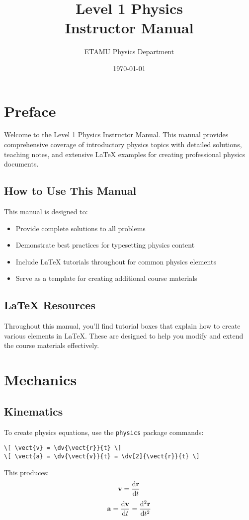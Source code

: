 \documentclass[11pt]{book}
\title{Level 1 Physics\\Instructor Manual}
\author{ETAMU Physics Department}
\date{\today}
\begin{document}
\frontmatter
\maketitle

\tableofcontents
\listoffigures

\chapter{Preface}

Welcome to the Level 1 Physics Instructor Manual. This manual provides comprehensive coverage of introductory physics topics with detailed solutions, teaching notes, and extensive LaTeX examples for creating professional physics documents.

\section{How to Use This Manual}

This manual is designed to:
\begin{itemize}
    \item Provide complete solutions to all problems
    \item Demonstrate best practices for typesetting physics content
    \item Include LaTeX tutorials throughout for common physics elements
    \item Serve as a template for creating additional course materials
\end{itemize}

\section{LaTeX Resources}

Throughout this manual, you'll find tutorial boxes that explain how to create various elements in LaTeX. These are designed to help you modify and extend the course materials effectively.

\mainmatter

\chapter{Mechanics}

\section{Kinematics}

\begin{tutorialbox}[title=Typesetting Physics Equations]
To create physics equations, use the \texttt{physics} package commands:
\begin{verbatim}
\[ \vect{v} = \dv{\vect{r}}{t} \]
\[ \vect{a} = \dv{\vect{v}}{t} = \dv[2]{\vect{r}}{t} \]
\end{verbatim}
This produces:
\[ \mathbf{v} = \dv{\mathbf{r}}{t} \]
\[ \mathbf{a} = \dv{\mathbf{v}}{t} = \dv[2]{\mathbf{r}}{t} \]
\end{tutorialbox}
\end{document}
